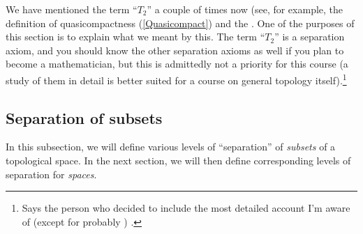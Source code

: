 We have mentioned the term ``$T_2$'' a couple of times now (see, for example, the definition of quasicompactness (\cref{Quasicompact}) and the .  One of the purposes of this section is to explain what we meant by this.  The term ``$T_2$'' is a separation axiom, and you should know the other separation axioms as well if you plan to become a mathematician, but this is admittedly not a priority for this course (a study of them in detail is better suited for a course on general topology itself).\footnote{Says the person who decided to include the most detailed account I'm aware of (except for probably \cite{Steen}) \textellipsis .}

\subsection{Separation of subsets}

In this subsection, we will define various levels of ``separation'' of \emph{subsets} of a topological space.  In the next section, we will then define corresponding levels of separation for \emph{spaces}.

